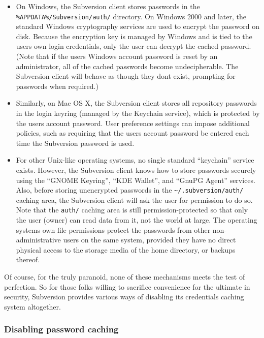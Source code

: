 \begin{itemize}
\item
  On Windows, the Subversion client stores passwords in the
  \texttt{\%APPDATA\%/Subversion/auth/} directory. On Windows 2000 and
  later, the standard Windows cryptography services are used to encrypt
  the password on disk. Because the encryption key is managed by Windows
  and is tied to the user\textquotesingle s own login credentials, only
  the user can decrypt the cached password. (Note that if the
  user\textquotesingle s Windows account password is reset by an
  administrator, all of the cached passwords become undecipherable. The
  Subversion client will behave as though they don\textquotesingle t
  exist, prompting for passwords when required.)
\item
  Similarly, on Mac OS X, the Subversion client stores all repository
  passwords in the login keyring (managed by the Keychain service),
  which is protected by the user\textquotesingle s account password.
  User preference settings can impose additional policies, such as
  requiring that the user\textquotesingle s account password be entered
  each time the Subversion password is used.
\item
  For other Unix-like operating systems, no single standard ``keychain''
  service exists. However, the Subversion client knows how to store
  passwords securely using the ``GNOME Keyring'', ``KDE Wallet'', and
  ``GnuPG Agent'' services. Also, before storing unencrypted passwords
  in the \texttt{\textasciitilde{}/.subversion/auth/} caching area, the
  Subversion client will ask the user for permission to do so. Note that
  the \texttt{auth/} caching area is still permission-protected so that
  only the user (owner) can read data from it, not the world at large.
  The operating system\textquotesingle s own file permissions protect
  the passwords from other non-administrative users on the same system,
  provided they have no direct physical access to the storage media of
  the home directory, or backups thereof.
\end{itemize}

Of course, for the truly paranoid, none of these mechanisms meets the
test of perfection. So for those folks willing to sacrifice convenience
for the ultimate in security, Subversion provides various ways of
disabling its credentials caching system altogether.

\subsubsection{Disabling password
caching}\label{svn.tour.initial.disabling-password-caching}

